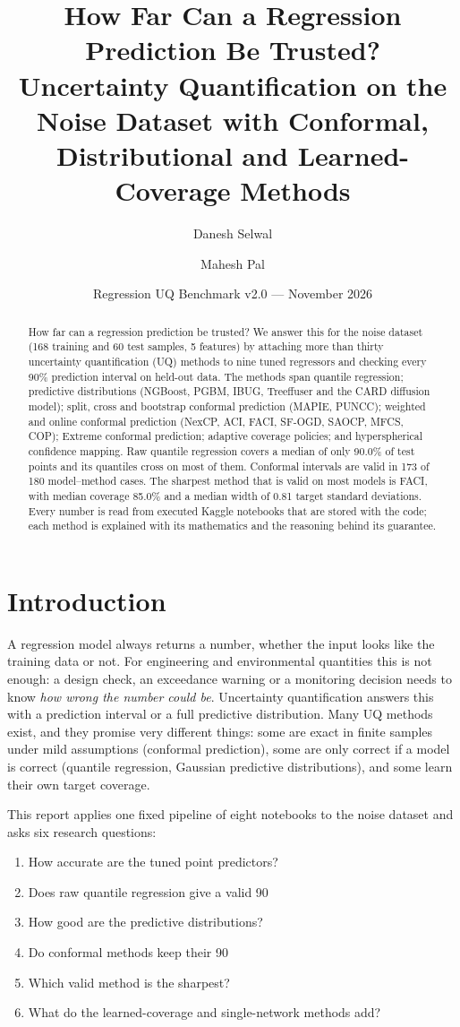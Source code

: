 \documentclass[11pt]{article}
\title{How Far Can a Regression Prediction Be Trusted?\\[2pt] \large Uncertainty Quantification on the Noise Dataset with Conformal, Distributional and Learned-Coverage Methods}
\author{Danesh Selwal \and Mahesh Pal}
\date{Regression UQ Benchmark v2.0 --- November 2026}
\begin{document}
\maketitle
\begin{abstract}How far can a regression prediction be trusted? We answer this for the noise dataset (168 training and 60 test samples, 5 features) by attaching more than thirty uncertainty quantification (UQ) methods to nine tuned regressors and checking every 90\% prediction interval on held-out data. The methods span quantile regression; predictive distributions (NGBoost, PGBM, IBUG, Treeffuser and the CARD diffusion model); split, cross and bootstrap conformal prediction (MAPIE, PUNCC); weighted and online conformal prediction (NexCP, ACI, FACI, SF-OGD, SAOCP, MFCS, COP); Extreme conformal prediction; adaptive coverage policies; and hyperspherical confidence mapping. Raw quantile regression covers a median of only 90.0\% of test points and its quantiles cross on most of them. Conformal intervals are valid in 173 of 180 model--method cases. The sharpest method that is valid on most models is FACI, with median coverage 85.0\% and a median width of 0.81 target standard deviations. Every number is read from executed Kaggle notebooks that are stored with the code; each method is explained with its mathematics and the reasoning behind its guarantee.\end{abstract}
\tableofcontents
\newpage
\section{Introduction}
A regression model always returns a number, whether the input looks like the training data or not. For engineering and environmental
quantities this is not enough: a design check, an exceedance warning or a monitoring decision needs to know \emph{how wrong the number could be}.
Uncertainty quantification answers this with a prediction interval or a full predictive distribution. Many UQ methods exist, and they
promise very different things: some are exact in finite samples under mild assumptions (conformal prediction), some are only correct if a
model is correct (quantile regression, Gaussian predictive distributions), and some learn their own target coverage.

This report applies one fixed pipeline of eight notebooks to the noise dataset and asks six research questions:
\begin{enumerate}[label=\textbf{RQ\arabic*.}]
\item How accurate are the tuned point predictors?
\item Does raw quantile regression give a valid 90%
\item How good are the predictive distributions?
\item Do conformal methods keep their 90%
\item Which valid method is the sharpest?
\item What do the learned-coverage and single-network methods add?
\end{enumerate}
\end{document}
